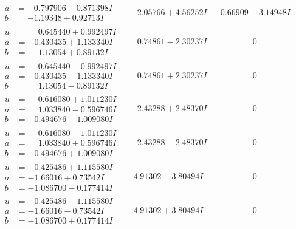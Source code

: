 \documentclass[1p]{elsarticle_modified}
\theoremstyle{definition}
\begin{document}
$$\begin{array}{c|c|c}
\begin{aligned}
a &= -0.797906 - 0.871398 I \\
b &= -1.19348 + 0.92713 I\end{aligned}
 & \phantom{-}2.05766 + 4.56252 I & -0.66909 - 3.14948 I \\ \hline\begin{aligned}
u &= \phantom{-}0.645440 + 0.992497 I \\
a &= -0.430435 + 1.133340 I \\
b &= \phantom{-}1.13054 + 0.89132 I\end{aligned}
 & \phantom{-}0.74861 - 2.30237 I & \phantom{-0.000000 } 0 \\ \hline\begin{aligned}
u &= \phantom{-}0.645440 - 0.992497 I \\
a &= -0.430435 - 1.133340 I \\
b &= \phantom{-}1.13054 - 0.89132 I\end{aligned}
 & \phantom{-}0.74861 + 2.30237 I & \phantom{-0.000000 } 0 \\ \hline\begin{aligned}
u &= \phantom{-}0.616080 + 1.011230 I \\
a &= \phantom{-}1.033840 - 0.596746 I \\
b &= -0.494676 - 1.009080 I\end{aligned}
 & \phantom{-}2.43288 + 2.48370 I & \phantom{-0.000000 } 0 \\ \hline\begin{aligned}
u &= \phantom{-}0.616080 - 1.011230 I \\
a &= \phantom{-}1.033840 + 0.596746 I \\
b &= -0.494676 + 1.009080 I\end{aligned}
 & \phantom{-}2.43288 - 2.48370 I & \phantom{-0.000000 } 0 \\ \hline\begin{aligned}
u &= -0.425486 + 1.115580 I \\
a &= -1.66016 + 0.73542 I \\
b &= -1.086700 - 0.177414 I\end{aligned}
 & -4.91302 - 3.80494 I & \phantom{-0.000000 } 0 \\ \hline\begin{aligned}
u &= -0.425486 - 1.115580 I \\
a &= -1.66016 - 0.73542 I \\
b &= -1.086700 + 0.177414 I\end{aligned}
 & -4.91302 + 3.80494 I & \phantom{-0.000000 } 0 \\ \hline\begin{aligned}

\end{aligned}
\end{array}$$
\end{document}
